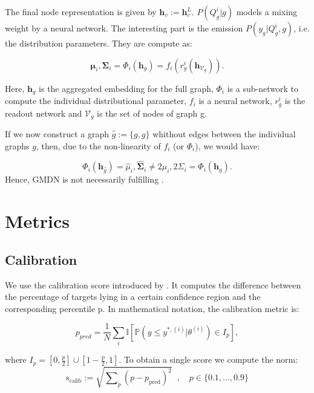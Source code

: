 The final node representation is given by $\mathbf h_v :=  \mathbf h_v^L$. $P(Q_g^i|g)$ models a mixing weight by a neural network. The interesting part is the emission $P(y_g| Q_g^i, g)$, i.e. the distribution parameters. They are compute as: 

\begin{equation}
\mathbf \mu_i, \mathbf \Sigma_i = \Phi_i(\mathbf h_g) = f_i(r_g^i(\mathbf h_{\mathcal V_g})).
\end{equation}

Here, $\mathbf h_g$ is the aggregated embedding for the full graph, $\Phi_i$ is a sub-network to compute the individual distributional parameter, $f_i$ is a neural network, $r_g^i$ is the readout network and $\mathcal V_g$ is the set of nodes of graph g.

If we now construct a graph $\hat g := \{g, g\}$ whithout edges between the individual graphs $g$, then, due to the non-linearity of $f_i$ (or $\Phi_i$), we would have:

\begin{equation}
\Phi_i(\mathbf h_{\hat g}) = \hat \mu_i, \hat{\mathbf \Sigma}_i \neq 2\mu_i, 2\Sigma_i = \Phi_i(\mathbf h_g).
\end{equation}
Hence, GMDN is not necessarily fulfilling \desfour{}.



\clearpage
\section{Metrics}
\subsection{Calibration}
We use the calibration score introduced by \citet{accurate-uncertainties-deep-learning-regression}. It computes the difference between the percentage of targets lying in a certain confidence region and the corresponding percentile p. In mathematical notation, the calibration metric is: 

\begin{equation}
    p_{pred} = \frac{1}{N} \sum_i \mathbb{I}\left[\mathbb{P}\left(y \leq y^{*, (i)}| \theta^{(i)}\right) \in I_p\right],
\end{equation}

where $I_p = [0, \frac{p}{2}] \cup [1-\frac{p}{2}, 1]$. To obtain a single score we compute the norm:
\begin{equation}
    \text{s}_{\text{calib}} := \sqrt{\sum\nolimits_p (p - p_{\text{pred}})^2}\;\; , \quad p \in \{0.1, \dots, 0.9\}
\end{equation}


